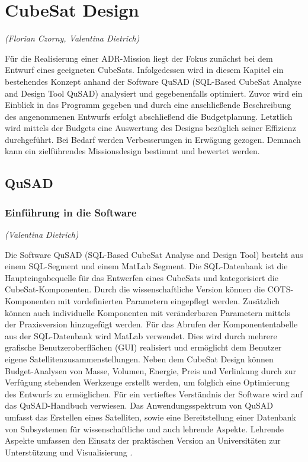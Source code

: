 \chapter{CubeSat Design}
\hfill\emph{(Florian Czorny, Valentina Dietrich)}

	Für die Realisierung einer ADR-Mission liegt der Fokus zunächst bei dem Entwurf eines geeigneten CubeSats. Infolgedessen wird in diesem Kapitel ein bestehendes Konzept \cite{Lettau.} anhand der Software QuSAD (SQL-Based CubeSat Analyse and Design Tool QuSAD) analysiert und gegebenenfalls optimiert. Zuvor wird ein Einblick in das Programm gegeben und durch eine anschließende Beschreibung des angenommenen Entwurfs erfolgt abschließend die Budgetplanung. Letztlich wird mittels der Budgets eine Auswertung des Designs bezüglich seiner Effizienz durchgeführt. Bei Bedarf werden Verbesserungen in Erwägung gezogen. Demnach kann ein zielführendes Missionsdesign bestimmt und bewertet werden.
		
		\section{QuSAD}
			
			\subsection{Einführung in die Software}
	\hfill\emph{(Valentina Dietrich)}
	
		Die Software QuSAD (SQL-Based CubeSat Analyse and Design Tool) besteht aus einem SQL-Segment und einem MatLab Segment. Die SQL-Datenbank ist die Haupteingabequelle für das Entwerfen eines CubeSats und kategorisiert die CubeSat-Komponenten. Durch die wissenschaftliche Version können die COTS-Komponenten mit vordefinierten Parametern eingepflegt werden. Zusätzlich können auch individuelle Komponenten mit veränderbaren Parametern mittels der Praxisversion hinzugefügt werden. Für das Abrufen der Komponententabelle aus der SQL-Datenbank wird MatLab verwendet. Dies wird durch mehrere grafische Benutzeroberflächen (GUI) realisiert und ermöglicht dem Benutzer eigene Satellitenzusammenstellungen. Neben dem CubeSat Design können Budget-Analysen von Masse, Volumen, Energie, Preis und Verlinkung durch zur Verfügung stehenden Werkzeuge erstellt werden, um folglich eine Optimierung des Entwurfs zu ermöglichen. Für ein vertieftes Verständnis der Software wird auf das QuSAD-Handbuch \cite{Farahvashi.2016} verwiesen. Das Anwendungsspektrum von QuSAD umfasst das Erstellen eines Satelliten, sowie eine Bereitstellung einer Datenbank von Subsystemen für wissenschaftliche und auch lehrende Aspekte. Lehrende Aspekte umfassen den Einsatz der praktischen Version an Universitäten zur Unterstützung und Visualisierung \cite{Farahvashi.2016b}. 
			
